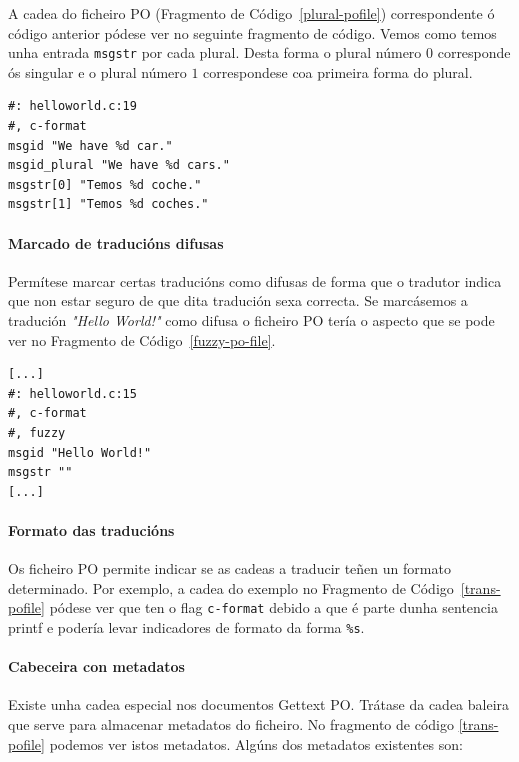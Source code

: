 A cadea do ficheiro PO (Fragmento de Código~\ref{plural-pofile}) correspondente ó código anterior pódese ver no seguinte fragmento de código. Vemos como temos unha entrada \lstinline{msgstr} por cada plural. Desta forma o plural número $0$ corresponde ós singular e o plural número $1$ correspondese coa primeira forma do plural.

\begin{lstlisting}[label=plural-pofile,caption=Plurais en GetText (Ficheiro PO).]
#: helloworld.c:19
#, c-format
msgid "We have %d car."
msgid_plural "We have %d cars."
msgstr[0] "Temos %d coche."
msgstr[1] "Temos %d coches."
\end{lstlisting}


\paragraph {Marcado de traducións difusas}
Permítese marcar certas traducións como difusas de forma que o tradutor indica que non estar seguro de que dita tradución sexa correcta. Se marcásemos a tradución \emph{"Hello World!"} como difusa o ficheiro PO tería o aspecto que se pode ver no Fragmento de Código~\ref{fuzzy-po-file}.

\begin{lstlisting}[label=fuzzy-po-file,caption=Ficheiro POT con comentario.]
[...]
#: helloworld.c:15
#, c-format
#, fuzzy
msgid "Hello World!"
msgstr ""
[...]
\end{lstlisting}

\paragraph {Formato das traducións}
Os ficheiro PO permite indicar se as cadeas a traducir teñen un formato determinado. Por exemplo, a cadea do exemplo no Fragmento de Código~\ref{trans-pofile} pódese ver que ten o flag \lstinline{c-format} debido a que é parte dunha sentencia printf e podería levar indicadores de formato da forma \lstinline{%s}.

\paragraph {Cabeceira con metadatos}
Existe unha cadea especial nos documentos Gettext PO. Trátase da cadea baleira que serve para almacenar metadatos do ficheiro. No fragmento de código \ref{trans-pofile} podemos ver istos metadatos. Algúns dos metadatos existentes son:

